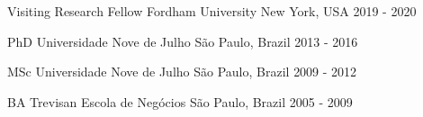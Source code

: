 

\begin{cventries}

	\cventry
	{Visiting Research Fellow} %
	{Fordham University} %
	{New York, USA} %
	{2019 - 2020} %

	\cventry
	{PhD} %
	{Universidade Nove de Julho} %
	{São Paulo, Brazil} %
	{2013 - 2016} %

	\cventry
	{MSc} %
	{Universidade Nove de Julho} %
	{São Paulo, Brazil} %
	{2009 - 2012} %

	\cventry
	{BA} %
	{Trevisan Escola de Negócios} %
	{São Paulo, Brazil} %
	{2005 - 2009} %

\end{cventries}
